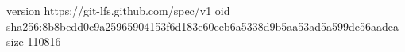 version https://git-lfs.github.com/spec/v1
oid sha256:8b8bedd0c9a25965904153f6d183e60eeb6a5338d9b5aa53ad5a599de56aadea
size 110816
